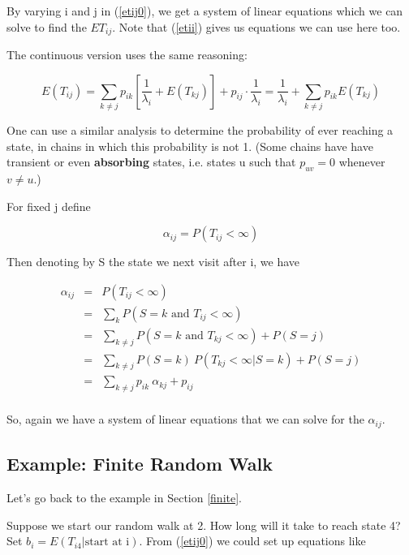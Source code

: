 By varying i and j in (\ref{etij0}), we get a system of linear equations
which we can solve to find the $ET_{ij}$.  Note that (\ref{etii}) gives
us equations we can use here too.

The continuous version uses the same reasoning:

\begin{equation}
\label{etijcontin}
E(T_{ij}) = \sum_{k \neq j} p_{ik} \left [ \frac{1}{\lambda_i}+E(T_{kj})
\right ] +  
p_{ij} \cdot \frac{1}{\lambda_i}
= \frac{1}{\lambda_i}+ \sum_{k \neq j} p_{ik} E(T_{kj})
\end{equation}


One can use a similar analysis to determine the probability of ever
reaching a state, in chains in which this probability is not 1.  (Some
chains have have transient or even {\bf absorbing} states, i.e. states u
such that $p_{uv} = 0$ whenever $v \neq u$.)

For fixed j define

\begin{equation}
\alpha_{ij} = P(T_{ij} < \infty)
\end{equation}

Then denoting by S the state we next visit after i, we have

\begin{eqnarray}
\label{absorb}
\alpha_{ij} &=& P(T_{ij} < \infty) \\
&=& \sum_{k} P(S = k \textrm{ and } T_{ij} < \infty) \\
&=& \sum_{k \neq j} P(S = k \textrm{ and } T_{kj} < \infty) + P(S = j) \\
&=& \sum_{k \neq j} P(S = k) ~ P(T_{kj} < \infty | S = k) + P(S = j) \\
&=& \sum_{k \neq j} p_{ik} ~ \alpha_{kj} + p_{ij} \\
\end{eqnarray}

So, again we have a system of linear equations that we can solve for the
$\alpha_{ij}$.

\subsection{Example:  Finite Random Walk}

Let's go back to the example in Section \ref{finite}.

Suppose we start our random walk at 2.  How long will it take to reach
state 4?  Set $b_i = E(T_{i4}|\textrm{start at i})$.  From (\ref{etij0})
we could set up equations like

